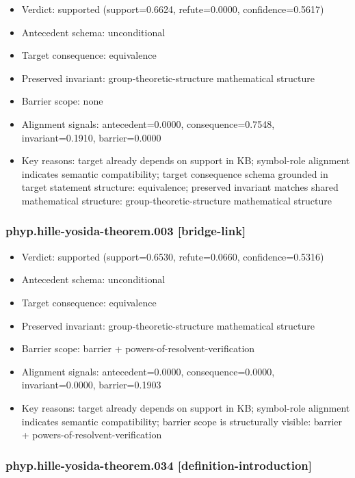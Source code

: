 \documentclass[
]{article}
\newcounter{none} %
\providecommand{\tightlist}{%
  \setlength{\itemsep}{0pt}\setlength{\parskip}{0pt}}
\begin{document}
\begin{itemize}
\tightlist
\item
  Verdict: supported (support=0.6624, refute=0.0000, confidence=0.5617)
\item
  Antecedent schema: unconditional
\item
  Target consequence: equivalence
\item
  Preserved invariant: group-theoretic-structure mathematical structure
\item
  Barrier scope: none
\item
  Alignment signals: antecedent=0.0000, consequence=0.7548,
  invariant=0.1910, barrier=0.0000
\item
  Key reasons: target already depends on support in KB; symbol-role
  alignment indicates semantic compatibility; target consequence schema
  grounded in target statement structure: equivalence; preserved
  invariant matches shared mathematical structure:
  group-theoretic-structure mathematical structure
\end{itemize}

\subsubsection{phyp.hille-yosida-theorem.003
{[}bridge-link{]}}\label{phyphille-yosida-theorem003-bridge-link}

\begin{itemize}
\tightlist
\item
  Verdict: supported (support=0.6530, refute=0.0660, confidence=0.5316)
\item
  Antecedent schema: unconditional
\item
  Target consequence: equivalence
\item
  Preserved invariant: group-theoretic-structure mathematical structure
\item
  Barrier scope: barrier + powers-of-resolvent-verification
\item
  Alignment signals: antecedent=0.0000, consequence=0.0000,
  invariant=0.0000, barrier=0.1903
\item
  Key reasons: target already depends on support in KB; symbol-role
  alignment indicates semantic compatibility; barrier scope is
  structurally visible: barrier + powers-of-resolvent-verification
\end{itemize}

\subsubsection{phyp.hille-yosida-theorem.034
{[}definition-introduction{]}}\label{phyphille-yosida-theorem034-definition-introduction}
\end{document}
